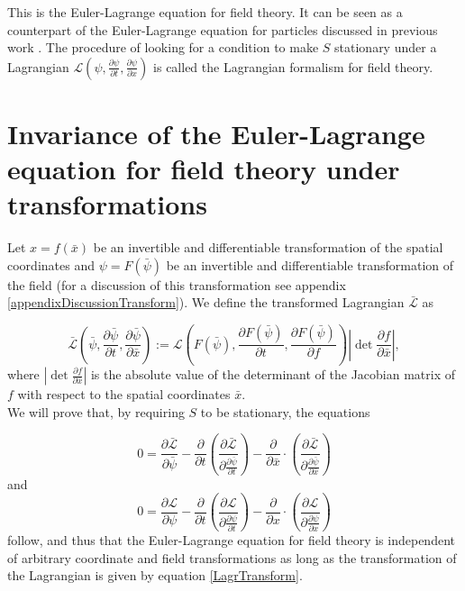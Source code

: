 \documentclass[prb,preprint]{revtex4-1}
\begin{document}
This is the Euler-Lagrange equation for field theory.
It can be seen as a counterpart of the Euler-Lagrange equation for particles discussed in previous work \cite{guthrie2019demystifying}.
The procedure of looking for a condition to make $S$ stationary under a Lagrangian $\mathcal{L}\left(\psi, \frac{\partial \psi}{\partial t}, \frac{\partial \psi}{\partial x}\right)$ is called the Lagrangian formalism for field theory.

\section{Invariance of the Euler-Lagrange equation for field theory under transformations} \label{sectionInvariance}

Let $x=f(\bar{x})$ be an invertible and differentiable transformation of the spatial coordinates and $\psi=F(\bar{\psi})$ be an invertible and differentiable transformation of the field (for a discussion of this transformation see appendix \ref{appendixDiscussionTransform}).
We define the transformed Lagrangian  $\bar{\mathcal{L}}$ as

\begin{equation} \label{LagrTransform}
\bar{\mathcal{L}}\left(\bar{\psi}, \frac{\partial \bar{\psi}}{\partial t}, \frac{\partial \bar{\psi}}{\partial \bar{x}}\right) 
:= \mathcal{L}\left(F(\bar{\psi}), \frac{\partial F(\bar{\psi})}{\partial t}, \frac{\partial F(\bar{\psi})}{\partial f}\right) 
\left| \det \frac{\partial f}{\partial \bar{x}} \right|,
\end{equation}
where $\left| \det \frac{\partial f}{\partial \bar{x}} \right|$ is the absolute value of the determinant of the Jacobian matrix of $f$ with respect to the spatial coordinates $\bar{x}$. \\

We will prove that, by requiring $S$ to be stationary, the equations

\begin{equation} \label{ELGTransformed}
0 = \frac{\partial \bar{\mathcal{L}}}{\partial \bar{\psi}}
-\frac{\partial}{\partial t} \left( \frac{\partial \mathcal{\bar{L}}}{\partial \frac{\partial \bar{\psi}}{\partial t}} \right) 
-\frac{\partial}{\partial \bar{x}} \cdot \left( \frac{\partial \mathcal{\bar{L}}}{\partial \frac{\partial \bar{\psi}}{\partial \bar{x}}} \right) 
\end{equation}
and
\begin{equation} \label{ELGUntransformed}
0 = \frac{\partial \mathcal{L}}{\partial \psi}
-\frac{\partial}{\partial t} \left( \frac{\partial \mathcal{L}}{\partial \frac{\partial \psi}{\partial t}} \right) 
-\frac{\partial}{\partial x} \cdot \left( \frac{\partial \mathcal{L}}{\partial \frac{\partial \psi}{\partial x}} \right) 
\end{equation}
follow, and thus that the Euler-Lagrange equation for field theory is independent of arbitrary coordinate and field transformations as long as the transformation of the Lagrangian is given by equation \eqref{LagrTransform}. \\
\end{document}
